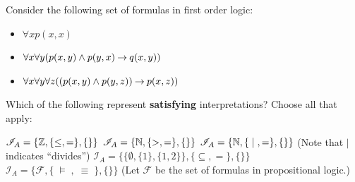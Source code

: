 \documentclass[addpoints]{exam}
\begin{document}
\begin{questions}

\clearpage
\question[5] Consider the following set of formulas in first order logic:
\begin{itemize}
\item $\forall x p(x,x)$
\item $\forall x \forall y (p(x,y) \land p(y,x) \mathbin{\rightarrow} q(x,y))$
\item $\forall x \forall y \forall z ((p(x,y) \land p(y,z)) \mathbin{\rightarrow} p(x,z))$
\end{itemize}
Which of the following represent \textbf{satisfying} interpretations?
Choose all that apply:
\begin{choices} 
\choice$\mathcal{I}_A = \{\mathbb{Z}, \{ \leq , = \}, \{\} \}$ 
\choice$\mathcal{I}_A = \{\mathbb{N}, \{ > , = \}, \{\} \}$ 
\choice$\mathcal{I}_A = \{\mathbb{N}, \{ \;|\; , = \}, \{\} \}$ (Note that $|$ indicates ``divides'')
\choice$\mathcal{I}_A = \{\{\emptyset, \{1\}, \{1,2\}\}, \{\subseteq , =  \}, \{\} \}$ 
\choice$\mathcal{I}_A = \{\mathcal{F}, \{\;\models \;, \;\equiv \; \}, \{\} \}$
(Let $\mathcal{F}$ be the set of formulas in propositional logic.)
\end{choices}


\end{questions}
\end{document}
